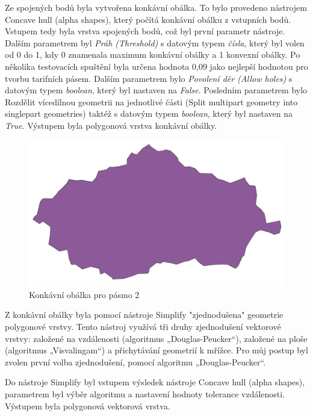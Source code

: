 Ze spojených bodů byla vytvořena konkávní obálka. To bylo provedeno nástrojem Concave hull (alpha shapes),
který počítá konkávní obálku z vstupních bodů. Vstupem tedy byla vrstva spojených bodů, což byl první parametr
nástroje. Dalším parametrem byl \textit{Práh (Threshold)} s datovým typem \textit{čísla}, který byl volen od 0 do 1,
kdy 0 znamenala maximum konkávní obálky a 1 konvexní obálky. Po několika testovacích spuštění byla 
určena hodnota 0,09 jako nejlepší hodnotou pro tvorbu tarifních pásem. Dalším parametrem bylo \textit{Povolení děr (Allow holes)} 
s datovým typem \textit{boolean}, který byl nastaven na \textit{False}.
Posledním parametrem bylo Rozdělit vícedílnou geometrii na jednotlivé části (Split multipart geometry 
into singlepart geometries) taktéž s datovým typem \textit{boolean}, který byl nastaven na \textit{True}.  
Výstupem byla polygonová vrstva konkávní obálky. 

\begin{figure}[H] \centering
    \includegraphics[width=400pt]{./pictures/concaveHull.png}
    \caption[Konkávní obálka pro pásmo 2]{Konkávní obálka pro pásmo 2}
	\label{fig:concaveHull}              
\end{figure} 

Z konkávní obálky byla pomocí nástroje Simplify "zjednodušena" geometrie polygonové vrstvy. Tento nástroj
využívá tři druhy zjednodušení vektorové vrstvy: založené na vzdálenosti (algoritmus „Douglas-Peucker“),
založené na ploše (algoritmus „Visvalingam“) a přichytávání geometrií k mřížce.
Pro můj postup byl zvolen první volba zjednodušení, pomocí algoritmu „Douglas-Peucker“.

Do nástroje Simplify byl vstupem výsledek nástroje Concave hull (alpha shapes), parametrem byl výběr algoritmu 
a nastavení hodnoty tolerance vzdálenosti. Výstupem byla polygonová vektorová vrstva.

